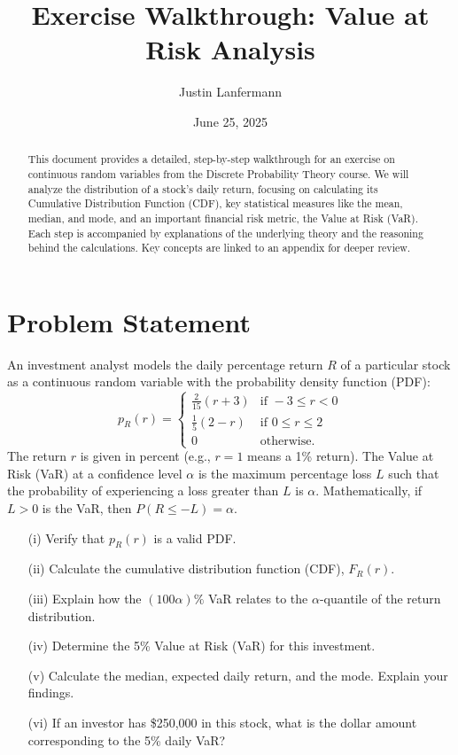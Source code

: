 \documentclass[11pt,a4paper]{article}
\title{\textbf{Exercise Walkthrough: Value at Risk Analysis}}
\author{Justin Lanfermann}
\date{June 25, 2025}
\begin{document}
\maketitle

\begin{abstract}
    This document provides a detailed, step-by-step walkthrough for an exercise on continuous random variables from the Discrete Probability Theory course. We will analyze the distribution of a stock's daily return, focusing on calculating its Cumulative Distribution Function (CDF), key statistical measures like the mean, median, and mode, and an important financial risk metric, the Value at Risk (VaR). Each step is accompanied by explanations of the underlying theory and the reasoning behind the calculations. Key concepts are linked to an appendix for deeper review.
\end{abstract}

\section{Problem Statement}

An investment analyst models the daily percentage return $R$ of a particular stock as a continuous random variable with the probability density function (PDF):
\[
p_R(r) =
\begin{cases}
    \frac{2}{15}(r+3) & \text{if } -3 \le r < 0 \\
    \frac{1}{5}(2-r) & \text{if } 0 \le r \le 2 \\
    0 & \text{otherwise.}
\end{cases}
\]
The return $r$ is given in percent (e.g., $r=1$ means a 1\% return). The Value at Risk (VaR) at a confidence level $\alpha$ is the maximum percentage loss $L$ such that the probability of experiencing a loss greater than $L$ is $\alpha$. Mathematically, if $L > 0$ is the VaR, then $P(R \le -L) = \alpha$.

\begin{enumerate}
    \item[(i)] Verify that $p_R(r)$ is a valid PDF.
    \item[(ii)] Calculate the cumulative distribution function (CDF), $F_R(r)$.
    \item[(iii)] Explain how the $(100\alpha)\%$ VaR relates to the $\alpha$-quantile of the return distribution.
    \item[(iv)] Determine the 5\% Value at Risk (VaR) for this investment.
    \item[(v)] Calculate the median, expected daily return, and the mode. Explain your findings.
    \item[(vi)] If an investor has \$250,000 in this stock, what is the dollar amount corresponding to the 5\% daily VaR?
\end{enumerate}
\end{document}

